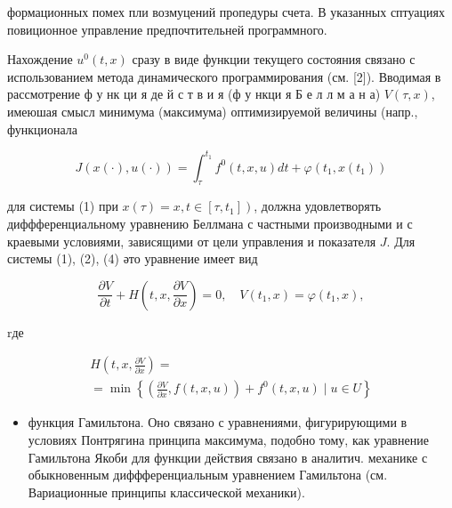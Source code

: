 \documentclass[10pt]{article}
\begin{document}
формационных помех пли возмуцений пропедуры счета. В указанных сптуациях повиционное управление предпочтительней программного.



Нахождение $u^{0}(t, x)$ сразу в виде функции текущего состояния связано с использованием метода динамического программирования (см. [2]). Вводимая в рассмотрение ф у нк ци я де й с т в и я (ф у нкци я Б е л л м а н а) $V(\tau, x)$, имеюшая смысл минимума (максимума) оптимизируемой величины (напр., функционала



\[

J(x(\cdot), u(\cdot))=\int_{\tau}^{t_{1}} f^{0}(t, x, u) d t+\varphi\left(t_{1}, x\left(t_{1}\right)\right)

\]



для системы (1) при $\left.x(\tau)=x, t \in\left[\tau, t_{1}\right]\right)$, должна удовлетворять диффференциальному уравнению Беллмана с частными производными и с краевыми условиями, зависящими от цели управления и показателя $J$. Для системы (1), (2), (4) әто уравнение имеет вид



\[

\frac{\partial V}{\partial t}+H\left(t, x, \frac{\partial V}{\partial x}\right)=0, \quad V\left(t_{1}, x\right)=\varphi\left(t_{1}, x\right),

\]



rде



\[

\begin{gathered}

H\left(t, x, \frac{\partial V}{\partial x}\right)= \\

=\min \left\{\left(\frac{\partial V}{\partial x}, f(t, x, u)\right)+f^{0}(t, x, u) \mid u \in U\right\}

\end{gathered}

\]



\begin{itemize}

  \item функция Гамильтона. Оно связано с уравнениями, фигурирующими в условиях Понтрягина принципа максимума, подобно тому, как уравнение Гамильтона Якоби для функции действия связано в аналитич. механике с обыкновенным диффференциальным уравнением Гамильтона (см. Вариационные принципы классической механики).

\end{itemize}
\end{document}
